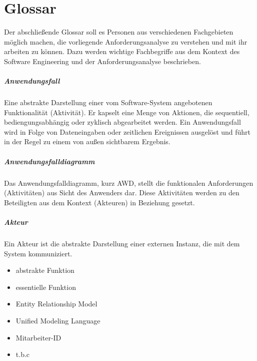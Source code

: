 \newpage

\chapter{Glossar}
Der abschlie{\ss}ende Glossar soll es Personen aus verschiedenen Fachgebieten möglich machen, die vorliegende Anforderungsanalyse zu verstehen und mit ihr arbeiten zu können. Dazu werden wichtige Fachbegriffe aus dem Kontext des Software Engineering und der Anforderungsanalyse beschrieben.

\paragraph{Anwendungsfall}
Eine abstrakte Darstellung einer vom Software-System angebotenen Funktionalität (Aktivität). Er kapselt eine Menge von Aktionen, die sequentiell, bediengungsabhängig oder zyklisch abgearbeitet werden. Ein Anwendungsfall wird in Folge von Dateneingaben oder zeitlichen Ereignissen ausgelöst und führt in der Regel zu einem von au{\ss}en sichtbarem Ergebnis.

\paragraph{Anwendungsfalldiagramm}
Das Anwendungsfalldiagramm, kurz AWD, stellt die funktionalen Anforderungen (Aktivitäten) aus Sicht des Anwenders dar. Diese Aktivitäten werden zu den Beteiligten aus dem Kontext (Akteuren) in Beziehung gesetzt.

\paragraph{Akteur}
Ein Akteur ist die abstrakte Darstellung einer externen Instanz, die mit dem System kommuniziert.


\begin{itemize}
	\item abstrakte Funktion
	\item essentielle Funktion
	\item Entity Relationship Model
	\item Unified Modeling Language
	\item Mitarbeiter-ID
	\item t.b.c
\end{itemize}




